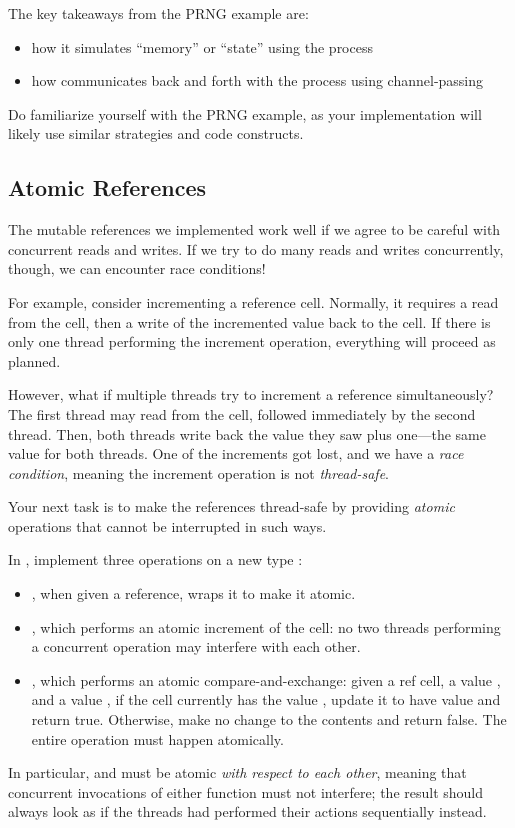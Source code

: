 \documentclass[11pt]{article}
\begin{document}
The key takeaways from the PRNG example are:
\begin{itemize}
  \item how it simulates ``memory'' or ``state'' using the  process
  \item how  communicates back and forth with the  process using channel-passing
\end{itemize}

Do familiarize yourself with the PRNG example, as your  implementation will likely use similar strategies and code constructs.


\subsection{Atomic References}

The mutable references we implemented work well if we agree to be careful with concurrent reads and writes.
If we try to do many reads and writes concurrently, though, we can encounter race conditions!

For example, consider incrementing a reference cell.
Normally, it requires a read from the cell, then a write of the incremented value back to the cell.
If there is only one thread performing the increment operation, everything will proceed as planned.

However, what if multiple threads try to increment a reference simultaneously?
The first thread may read from the cell, followed immediately by the second thread.
Then, both threads write back the value they saw plus one---the same value for both threads.
One of the increments got lost, and we have a \emph{race condition}, meaning the increment
operation is not \emph{thread-safe}.

Your next task is to make the references thread-safe by providing \emph{atomic} operations
that cannot be interrupted in such ways.

 In , implement three operations on a new type :
\begin{itemize}
  \item {}, when given a reference, wraps it to make it atomic.
  \item {}, which performs an atomic increment of the cell: no two threads performing
        a concurrent  operation may interfere with each other.
  \item {}, which performs an atomic compare-and-exchange: given a ref cell, a value
        , and a value , if the cell currently has the value ,
        update it to have value  and return true. Otherwise, make no change to the contents
        and return false. The entire operation must happen atomically.
\end{itemize}
In particular,  and  must be atomic \emph{with respect to each other},
meaning that concurrent invocations of either function must not interfere; the result should
always look as if the threads had performed their actions sequentially instead.
\end{document}
